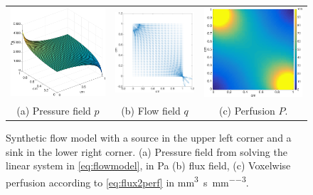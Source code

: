\documentclass[paper=a4, fontsize=11pt,parskip=half,headings=small]{scrartcl}
\newcommand{\siP}{\milli\meter\cubed\per\second\per\milli\meter\cubed}
\begin{document}
	\begin{figure}[H]
		\centering
		\begin{tabular}{c c c}
			\includegraphics[width=.3\textwidth]{figs/pressure.eps} & \includegraphics[width=.3\textwidth]{figs/flowQuiver.eps} & \includegraphics[width=.3\textwidth]{figs/perfusion.eps}\\
			(a) Pressure field $p$ & (b) Flow field $q$ & (c) Perfusion $P$.
		\end{tabular}
    	\caption{Synthetic flow model with a source in the upper left corner and a sink in the lower right corner. (a) Pressure field from solving the linear system in \eqref{eq:flowmodel}, in \si{\pascal} (b) flux field, (c) Voxelwise perfusion according to \eqref{eq:flux2perf} in \si{\siP}.}
	        \label{fig:flowpressureperfusion}
	\end{figure}
	
\end{document}
